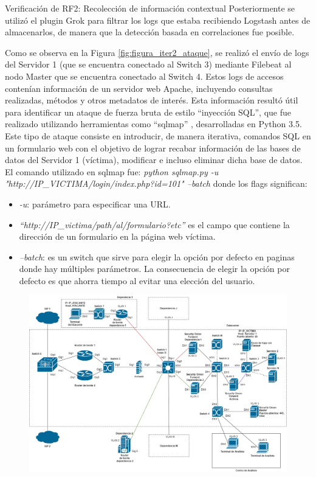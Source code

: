 \begin{section}{Verificación de RF2: Recolección de información contextual}
    Posteriormente se utilizó el plugin Grok para filtrar los logs que estaba recibiendo Logstash antes de almacenarlos, de manera que la detección basada en correlaciones fue posible.\par
    Como se observa en la Figura \ref{fig:figura_iter2_ataque}, se realizó el envío de logs del Servidor 1 (que se encuentra conectado al Switch 3) mediante Filebeat al nodo Master que se encuentra conectado al Switch 4. Estos logs de accesos contenían información de un servidor web Apache, incluyendo consultas realizadas, métodos y otros metadatos de interés. Esta información resultó útil para identificar un ataque de fuerza bruta de estilo “inyección SQL”, que fue realizado utilizando herramientas como “sqlmap” \cite{sqlmap}, desarrolladas en Python 3.5. Este tipo de ataque consiste en introducir, de manera iterativa, comandos SQL en un formulario web con el objetivo de lograr recabar información de las bases de datos del Servidor 1 (víctima), modificar e incluso eliminar dicha base de datos. El comando utilizado en sqlmap fue: 
    \textit{python sqlmap.py -u "http://IP\_VICTIMA/login/index.php?id=101" --batch} donde los flags significan:
    \begin{itemize}
    \item \textit{-u}: parámetro para especificar una URL.
    \item \textit{“http://IP\_victima/path/al/formulario?etc”} es el campo que contiene la dirección de un formulario en la página web víctima.
    \item \textit{--batch}: es un switch que sirve para elegir la opción por defecto en paginas donde hay múltiples parámetros. La consecuencia de elegir la opción por defecto es que ahorra tiempo al evitar una elección del usuario.
   \end{itemize}
    \begin{figure}[H]
    \centering
    \includegraphics[width=1\textwidth]{./iteracion_2_imagenes/figura_iter2_ataque.png}

\end{figure}
\end{section}
